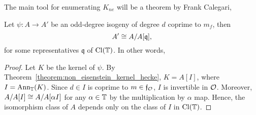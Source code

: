 \documentclass{article}
\begin{document}
The main tool for enumerating $K_{ne}$ will be a theorem by Frank Calegari,
\begin{theorem}\label{theorem:non_eisenstein_no_conductor}
    Let $\psi:A\to A'$ be an odd-degree isogeny of degree $d$ coprime to $m_f$,
    then
    \[
        A' \cong A/A[\mathfrak{q}],
    \]
    for some representatives $\mathfrak{q}$ of $\operatorname{Cl}(\mathbb{T})$. In other words, 
\end{theorem}
\begin{proof}
    Let $K$ be the kernel of $\psi$. By
    Theorem~\ref{theorem:non_eisenstein_kernel_hecke}, $K=A[I]$, where
    $I=\operatorname{Ann}_{\mathbb{T}}(K)$. Since $d\in I$ is coprime to $m\in \mathfrak{f}_{\mathcal{O}}$,
    $I$ is invertible in $\mathcal{O}$. Moreover, $A/A[I]\cong A/A[\alpha I]$ for
    any $\alpha\in \mathbb{T}$ by the multiplication by $\alpha$ map. Hence, the
    isomorphism class of $A$ depends only on the class of $I$ in $\operatorname{Cl}(\mathbb{T})$.
\end{proof}





\end{document}
